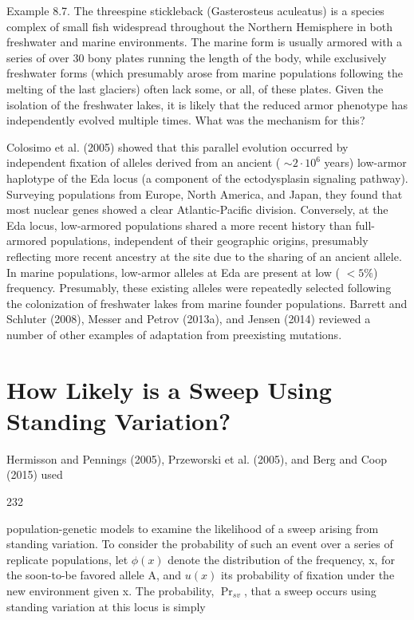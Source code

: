 \documentclass{article}
\begin{document}
Example 8.7. The threespine stickleback (Gasterosteus aculeatus) is a species complex of small fish widespread throughout the Northern Hemisphere in both freshwater and marine environments. The marine form is usually armored with a series of over 30 bony plates running the length of the body, while exclusively freshwater forms (which presumably arose from marine populations following the melting of the last glaciers) often lack some, or all, of these plates. Given the isolation of the freshwater lakes, it is likely that the reduced armor phenotype has independently evolved multiple times. What was the mechanism for this?

Colosimo et al. (2005) showed that this parallel evolution occurred by independent fixation of alleles derived from an ancient ( $ \sim2 \cdot 10^6 $ years) low-armor haplotype of the Eda locus (a component of the ectodysplasin signaling pathway). Surveying populations from Europe, North America, and Japan, they found that most nuclear genes showed a clear Atlantic-Pacific division. Conversely, at the Eda locus, low-armored populations shared a more recent history than full-armored populations, independent of their geographic origins, presumably reflecting more recent ancestry at the site due to the sharing of an ancient allele. In marine populations, low-armor alleles at Eda are present at low ( $ <5\% $) frequency. Presumably, these existing alleles were repeatedly selected following the colonization of freshwater lakes from marine founder populations. Barrett and Schluter (2008), Messer and Petrov (2013a), and Jensen (2014) reviewed a number of other examples of adaptation from preexisting mutations.

\section{How Likely is a Sweep Using Standing Variation?}
Hermisson and Pennings (2005), Przeworski et al. (2005), and Berg and Coop (2015) used

232

population-genetic models to examine the likelihood of a sweep arising from standing variation. To consider the probability of such an event over a series of replicate populations, let  $ \phi(x) $ denote the distribution of the frequency, x, for the soon-to-be favored allele A, and  $ u(x) $ its probability of fixation under the new environment given x. The probability,  $ \Pr_{sv} $, that a sweep occurs using standing variation at this locus is simply
\end{document}
